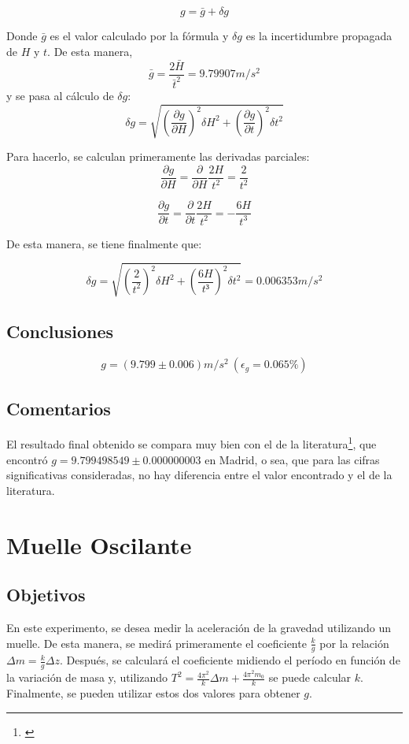 \documentclass[a4paper,12pt]{article}
\begin{document}
$$g = \bar{g} + \delta g$$

Donde $ \bar{g}$ es el valor calculado por la fórmula y $\delta g$ es la incertidumbre propagada de $H$ y $t$.
De esta manera, 
$$\bar{g}=\frac{2\bar{H}}{\bar{t}^2}= 9.79907 m/s^2$$
y se pasa al cálculo de $\delta g$:
$$\delta g = \sqrt{(\frac{\partial g}{\partial H})^2\delta H ^2 + (\frac{\partial g}{\partial t})^2 \delta t^2}$$

Para hacerlo, se calculan primeramente las derivadas parciales:
$$\frac{\partial g}{\partial H} = \frac{\partial}{\partial H} \frac{2H}{t^2} = \frac{2}{t^2}$$

$$\frac{\partial g}{\partial t} = \frac{\partial}{\partial t} \frac{2H}{t^2} = -\frac{6H}{t^3}$$

De esta manera, se tiene finalmente que:

$$ \delta g = \sqrt{\left(\frac{2}{t^2}\right)^2\delta H^2 + \left( \frac{6H}{t³} \right)^2 \delta t^2} = 0.006353 m/s^2$$


  \subsection{Conclusiones}
\begin{tcolorbox}
  \begin{equation}
    g = (9.799 \pm 0.006) m/s^2 \ (\epsilon_g=0.065\%)
\end{equation}
\end{tcolorbox}

\subsection{Comentarios}
El resultado final obtenido se compara muy bien con el de la literatura\footnote{\cite{IGN}}, que encontró  $
g =  9.799498549\pm 0.000000003$ en Madrid, o sea, que para las cifras significativas consideradas, no hay
diferencia entre el valor encontrado y el de la literatura.
\pagebreak

\section{Muelle Oscilante}
\subsection{Objetivos}
En este experimento, se desea medir la aceleración de la gravedad utilizando un muelle. De esta 
manera, se medirá primeramente el coeficiente $\frac{k}{g}$ por la relación $\Delta m = \frac{k}{g}\Delta z$.
Después, se calculará el coeficiente midiendo el período en función de la variación de masa  y, 
utilizando $T^2 = \frac{4\pi^2}{k}\Delta m + \frac{4\pi^2 m_0}{k}$ se puede calcular $k$. Finalmente, se pueden
utilizar estos dos valores para obtener $g$.
\end{document}
